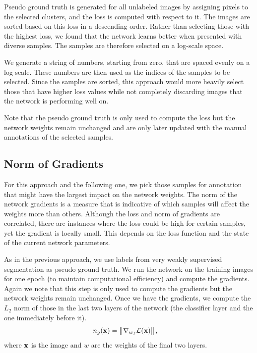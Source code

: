 \documentclass[letterpaper, 10 pt, conference]{ieeeconf}  %
\begin{document}
Pseudo ground truth is generated for all unlabeled images by assigning pixels to the selected clusters, and the loss is computed with respect to it. The images are sorted based on this loss in a descending order. Rather than selecting those with the highest loss, we found that the network learns better when presented with diverse samples. The samples are therefore selected on a log-scale space.

We generate a string of numbers, starting from zero, that are spaced evenly on a log scale. These numbers are then used as the indices of the samples to be selected. Since the samples are sorted, this approach would more heavily select those that have higher loss values while not completely discarding images that the network is performing well on.

Note that the pseudo ground truth is only used to compute the loss but the network weights remain unchanged and are only later updated with the manual annotations of the selected samples.


\subsection{Norm of Gradients} \label{sec:grad_norm}

For this approach and the following one, we pick those samples for annotation that might have the largest impact on the network weights. The norm of the network gradients is a measure that is indicative of which samples will affect the weights more than others. Although the loss and norm of gradients are correlated, there are instances where the loss could be high for certain samples, yet the gradient is locally small. This depends on the loss function and the state of the current network parameters. 

As in the previous approach, we use labels from very weakly supervised segmentation as pseudo ground truth. We run the network on the training images for one epoch (to maintain computational efficiency) and compute the gradients. Again we note that this step is only used to compute the gradients but the network weights remain unchanged. Once we have the gradients, we compute the $L_2$ norm of those in the last two layers of the network (the classifier layer and the one immediately before it).
\begin{align}
n_g(\bold{x}) &=  \left\lVert \nabla_{w_f} \mathcal{L}(\bold{x}) \right\rVert,
\end{align}  
where $\bold{x}$ is the image and $w$ are the weights of the final two layers.
\end{document}
